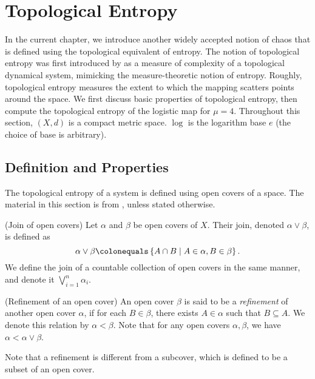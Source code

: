 \documentclass[10pt,twoside,draft]{book}
\begin{document}
\chapter{Topological Entropy}
\label{chap:entropy}
In the current chapter, we introduce another widely accepted notion of chaos that is defined using the topological equivalent of entropy.
The notion of topological entropy was first introduced by \citet{akm} as a measure of complexity of a topological dynamical system, mimicking the measure-theoretic notion of entropy.
Roughly, topological entropy measures the extent to which the mapping scatters points around the space.
We first discuss basic properties of topological entropy, then compute the topological entropy of the logistic map for $\mu = 4$.
Throughout this section, $(X,d)$ is a compact metric space.
$\log$ is the logarithm base $e$ (the choice of base is arbitrary).

\section{Definition and Properties}
The topological entropy of a system is defined using open covers of a space. 
The material in this section is from \citep{akm}, unless stated otherwise.
\begin{definition}
  (Join of open covers)
  Let $\alpha$ and $\beta$ be open covers of $X$.
  Their join, denoted $\alpha \vee \beta$, is defined as
  \begin{equation*}
    \alpha \vee \beta \ceq \setst{A \cap B}{A \in \alpha, B \in \beta}.
  \end{equation*}
  We define the join of a countable collection of open covers in the same manner, and denote it $\bigvee\limits_{i = 1}^{n} \alpha_i$.
\end{definition}
\begin{definition}
  (Refinement of an open cover)
  An open cover $\beta$ is said to be a \textit{refinement} of another open cover $\alpha$, if for each $B \in \beta$, there exists $A \in \alpha$ such that $B \subseteq A$.
  We denote this relation by $\alpha < \beta$.
  Note that for any open covers $\alpha, \beta$, we have $\alpha < \alpha \vee \beta$.
\end{definition}
Note that a refinement is different from a subcover, which is defined to be a subset of an open cover.
\end{document}
